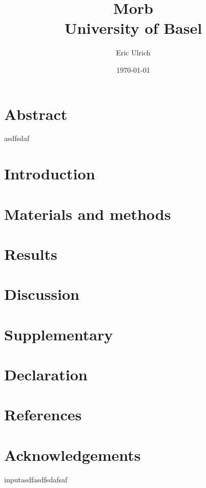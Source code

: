 \documentclass[12pt,twoside]{report}
\title{
    {Morb}\\
    {\large University of Basel}
}
\author{Eric Ulrich}
\date{\today}
\begin{document}
\maketitle

\pagestyle{empty} %
\tableofcontents


\chapter{Abstract}

asdfsdaf

\chapter{Introduction}



\chapter{Materials and methods}


\chapter{Results}


\chapter{Discussion}

\chapter{Supplementary}

\chapter{Declaration}


\chapter{References}

\printbibliography

\chapter{Acknowledgements}
input{asdfasdfsdafsaf}
\end{document}
